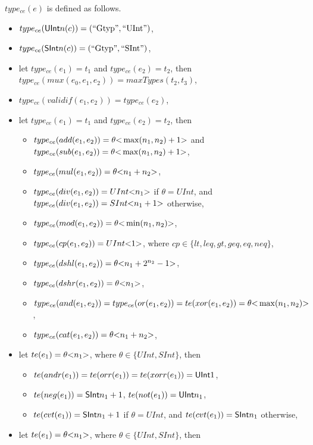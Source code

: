 {$type_{ce}(e)$ is defined as follows.
\begin{itemize}
\item $type_{ce}({\sf UInt}{n}(c)) = (\mbox{``Gtyp''}, \mbox{``UInt''})$,
%
\item $type_{ce}({\sf SInt}{n}(c)) = (\mbox{``Gtyp''}, \mbox{``SInt''})$,
%
\item let $type_{ce}(e_1) = t_1$ and $type_{ce}(e_2) = t_2$, then $type_{ce}(mux(e_0, e_1, e_2)) = maxTypes(t_2, t_3)$,
%
\item $type_{ce}(validif(e_1, e_2)) = type_{ce}(e_2)$,
%
\item let $type_{ce}(e_1) =t_1$ and $type_{ce}(e_2) = t_2$, then
\begin{itemize}
\item $type_{ce}(add(e_1, e_2)) =\theta \mbox{<} \max(n_1, n_2)+1 \mbox{>}$ and $type_{ce}(sub(e_1, e_2)) = \theta \mbox{<} \max(n_1, n_2)+1 \mbox{>}$,
%
\item $type_{ce}(mul(e_1, e_2)) = \theta \mbox{<} n_1+n_2 \mbox{>}$,
%
\item $type_{ce}(div(e_1, e_2)) = UInt \mbox{<} n_1 \mbox{>}$ if $\theta = UInt$, and $type_{ce}(div(e_1, e_2)) = SInt \mbox{<} n_1+1 \mbox{>}$ otherwise,
%
\item $type_{ce}(mod(e_1, e_2)) = \theta \mbox{<} \min(n_1,n_2) \mbox{>}$,
%
\item $type_{ce}(cp(e_1, e_2)) = UInt \mbox{<} 1 \mbox{>}$, where $cp \in \{lt, leq, gt, geq, eq, neq\}$,
%
\item $type_{ce}(dshl(e_1, e_2)) = \theta \mbox{<} n_1+2^{n_2}-1 \mbox{>}$,
%
\item $type_{ce}(dshr(e_1, e_2)) = \theta \mbox{<} n_1 \mbox{>}$,
%
\item $type_{ce}(and(e_1, e_2)) = type_{ce}(or(e_1, e_2)) =  te(xor(e_1, e_2)) = \theta \mbox{<} \max(n_1, n_2) \mbox{>}$,
%
\item $type_{ce}(cat(e_1, e_2)) = \theta \mbox{<} n_1 + n_2 \mbox{>}$,
\end{itemize}
%
\item let $te(e_1) = \theta \mbox{<} n_1 \mbox{>}$, where $\theta \in \{UInt, SInt\}$, then
\begin{itemize}
\item $te(andr(e_1)) = te(orr(e_1)) =  te(xorr(e_1)) = {\sf UInt}{1}$,
%
\item $te(neg(e_1)) = {\sf SInt}{n_1 +1}$, $te(not(e_1)) =  {\sf UInt}{n_1}$,
%
\item $te(cvt(e_1)) = {\sf SInt}{n_1 +1}$ if $\theta = UInt$, and $te(cvt(e_1)) =  {\sf SInt}{n_1}$ otherwise,
\end{itemize}
%
\item let $te(e_1) = \theta \mbox{<} n_1 \mbox{>}$, where $\theta \in \{UInt, SInt\}$, then

\end{itemize}}

